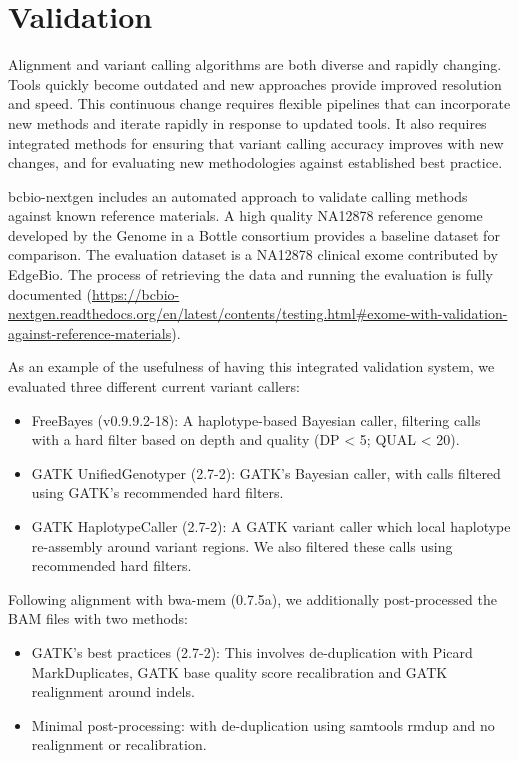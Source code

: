 \documentclass{frontiersSCNS}
\begin{document}
\section*{Validation}

Alignment and variant calling algorithms are both diverse and rapidly
changing. Tools quickly become outdated and new approaches provide improved
resolution and speed. This continuous change requires flexible pipelines that
can incorporate new methods and iterate rapidly in response to updated tools. It
also requires integrated methods for ensuring that variant calling accuracy
improves with new changes, and for evaluating new methodologies against
established best practice.

bcbio-nextgen includes an automated approach to validate calling methods against
known reference materials. A high quality NA12878 reference genome developed by
the Genome in a Bottle consortium \citep{zook_integrating_2013} provides a
baseline dataset for comparison. The evaluation dataset is a NA12878 clinical
exome contributed by EdgeBio. The process of retrieving the data and running the
evaluation is fully documented
(\url{https://bcbio-nextgen.readthedocs.org/en/latest/contents/testing.html#exome-with-validation-against-reference-materials}).

As an example of the usefulness of having this integrated validation system, we
evaluated three different current variant callers:

\begin{itemize}
\item FreeBayes (v0.9.9.2-18): A haplotype-based Bayesian caller, filtering
  calls with a hard filter based on depth and quality (DP < 5; QUAL < 20).

\item GATK UnifiedGenotyper (2.7-2): GATK’s Bayesian caller, with
  calls filtered using GATK's recommended hard filters.

\item GATK HaplotypeCaller (2.7-2): A GATK variant caller which local haplotype
  re-assembly around variant regions. We also filtered these calls using
  recommended hard filters.
\end{itemize}

Following alignment with bwa-mem (0.7.5a), we additionally post-processed
the BAM files with two methods:

\begin{itemize}
\item GATK’s best practices (2.7-2): This involves de-duplication with Picard
  MarkDuplicates, GATK base quality score recalibration and GATK realignment
  around indels.
\item Minimal post-processing: with de-duplication using samtools rmdup and no
  realignment or recalibration.
\end{itemize}
\end{document}
